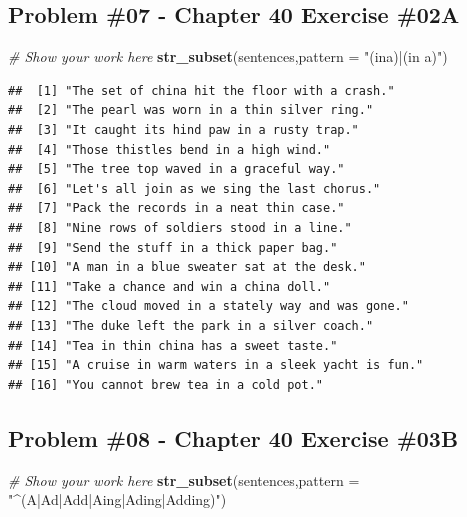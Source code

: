 \documentclass[
]{article}
\newenvironment{Shaded}{\begin{snugshade}}{\end{snugshade}}
\newcommand{\AttributeTok}[1]{\textcolor[rgb]{0.13,0.29,0.53}{#1}}
\newcommand{\CommentTok}[1]{\textcolor[rgb]{0.56,0.35,0.01}{\textit{#1}}}
\newcommand{\FunctionTok}[1]{\textcolor[rgb]{0.13,0.29,0.53}{\textbf{#1}}}
\newcommand{\NormalTok}[1]{#1}
\newcommand{\StringTok}[1]{\textcolor[rgb]{0.31,0.60,0.02}{#1}}
\begin{document}
\hypertarget{problem-07---chapter-40-exercise-02a}{%
\subsection{Problem \#07 - Chapter 40 Exercise
\#02A}\label{problem-07---chapter-40-exercise-02a}}

\begin{Shaded}
\begin{Highlighting}[]
\CommentTok{\# Show your work here}
\FunctionTok{str\_subset}\NormalTok{(sentences,}\AttributeTok{pattern =} \StringTok{"(ina)|(in a)"}\NormalTok{)}
\end{Highlighting}
\end{Shaded}

\begin{verbatim}
##  [1] "The set of china hit the floor with a crash."    
##  [2] "The pearl was worn in a thin silver ring."       
##  [3] "It caught its hind paw in a rusty trap."         
##  [4] "Those thistles bend in a high wind."             
##  [5] "The tree top waved in a graceful way."           
##  [6] "Let's all join as we sing the last chorus."      
##  [7] "Pack the records in a neat thin case."           
##  [8] "Nine rows of soldiers stood in a line."          
##  [9] "Send the stuff in a thick paper bag."            
## [10] "A man in a blue sweater sat at the desk."        
## [11] "Take a chance and win a china doll."             
## [12] "The cloud moved in a stately way and was gone."  
## [13] "The duke left the park in a silver coach."       
## [14] "Tea in thin china has a sweet taste."            
## [15] "A cruise in warm waters in a sleek yacht is fun."
## [16] "You cannot brew tea in a cold pot."
\end{verbatim}

\newpage

\hypertarget{problem-08---chapter-40-exercise-03b}{%
\subsection{Problem \#08 - Chapter 40 Exercise
\#03B}\label{problem-08---chapter-40-exercise-03b}}

\begin{Shaded}
\begin{Highlighting}[]
\CommentTok{\# Show your work here}
\FunctionTok{str\_subset}\NormalTok{(sentences,}\AttributeTok{pattern =} \StringTok{"\^{}(A|Ad|Add|Aing|Ading|Adding)"}\NormalTok{)}
\end{Highlighting}
\end{Shaded}
\end{document}
